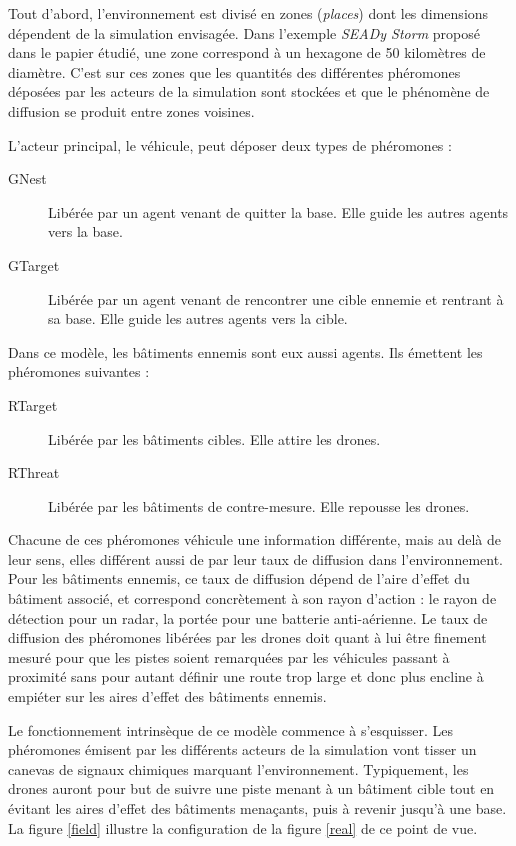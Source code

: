 \documentclass[12pt]{article}
\begin{document}
Tout d'abord, l'environnement est divisé en zones (\textit{places})
dont les dimensions dépendent de la simulation envisagée.  Dans
l'exemple \textit{SEADy Storm} proposé dans le papier étudié, une zone
correspond à un hexagone de 50 kilomètres de diamètre. C'est sur ces
zones que les quantités des différentes phéromones déposées par les
acteurs de la simulation sont stockées et que le phénomène de
diffusion se produit entre zones voisines.

L'acteur principal, le véhicule, peut déposer deux types de phéromones
:

\begin{description}
\item[GNest]{Libérée par un agent venant de quitter la base. Elle
  guide les autres agents vers la base.}
\item[GTarget]{Libérée par un agent venant de rencontrer une cible
  ennemie et rentrant à sa base. Elle guide les autres agents vers la
  cible.}
\end{description}

Dans ce modèle, les bâtiments ennemis sont eux aussi agents. Ils
émettent les phéromones suivantes :

\begin{description}
\item[RTarget]{Libérée par les bâtiments cibles. Elle attire les
  drones.}
\item[RThreat]{Libérée par les bâtiments de contre-mesure. Elle
  repousse les drones.}
\end{description}

Chacune de ces phéromones véhicule une information différente, mais au
delà de leur sens, elles différent aussi de par leur taux de diffusion
dans l'environnement.  Pour les bâtiments ennemis, ce taux de
diffusion dépend de l'aire d'effet du bâtiment associé, et correspond
concrètement à son rayon d'action : le rayon de détection pour un
radar, la portée pour une batterie anti-aérienne.  Le taux de
diffusion des phéromones libérées par les drones doit quant à lui être
finement mesuré pour que les pistes soient remarquées par les
véhicules passant à proximité sans pour autant définir une route trop
large et donc plus encline à empiéter sur les aires d'effet des
bâtiments ennemis.

Le fonctionnement intrinsèque de ce modèle commence à s'esquisser. Les
phéromones émisent par les différents acteurs de la simulation vont
tisser un canevas de signaux chimiques marquant l'environnement.
Typiquement, les drones auront pour but de suivre une piste menant à
un bâtiment cible tout en évitant les aires d'effet des bâtiments
menaçants, puis à revenir jusqu'à une base. La figure \ref{field}
illustre la configuration de la figure \ref{real} de ce point de vue.
\end{document}
